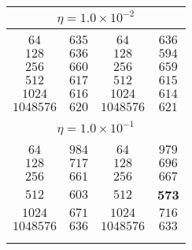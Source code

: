 \documentclass[10pt]{article}
\begin{document}
\begin{center}
\begin{table}[]
\begin{center}
\begin{tabular}{@{}cc|cc@{}}
\multicolumn{4}{c}{$\eta = 1.0\times 10^{-2}$} \\[5pt]
\hline\\[-11pt]
$64$ & $635$  & $64$ & $636$ \\  [1pt]
$128$ & $636$  & $128$ & $594$ \\  [1pt]
$256$ & $660$  & $256$ & $659$ \\  [1pt]
$512$ & $617$  & $512$ & $615$ \\  [1pt]
$1024$ & $616$  & $1024$ & $614$ \\  [1pt]
$1048576$ & $620$   & $1048576$ & $621$ \\  [1pt]
\hline\\[-11pt]

\multicolumn{4}{c}{$\eta = 1.0\times 10^{-1}$} \\[5pt]
\hline\\[-11pt]
$64$ & $984$  & $64$ & $979$ \\  [1pt]
$128$ & $717$  & $128$ & $696$ \\  [1pt]
$256$ & $661$  & $256$ & $667$ \\  [1pt]
$512$ & $603$  & $512$ & \textbf{573} \\  [1pt]
$1024$ & $671$  & $1024$ & $716$ \\  [1pt]
$1048576$ & $636$   & $1048576$ & $633$ \\ [1pt]
\hline\\[-11pt]

\hline\\[-8pt]
\end{tabular}\\[5pt]
\end{center}
\normalsize
\end{table}

\end{center}
\vspace*{\fill}

\clearpage
\end{document}
